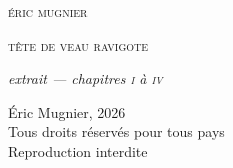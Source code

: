 \documentclass[12pt,twoside,openright]{memoir}
\begin{document}
\pagestyle{empty}

\begin{center}
\vspace*{6\onelineskip}
{\scshape\large éric mugnier}

\vspace{8\onelineskip}
{\scshape\huge tête de veau ravigote}

\vspace{2\onelineskip}
{\itshape extrait — chapitres \textsc{i} à \textsc{iv}}

\end{center}
\newpage
\thispagestyle{empty}
\vspace*{\fill}
{\footnotesize\noindent
\textcopyright{} Éric Mugnier, 2026\\
Tous droits réservés pour tous pays\\
Reproduction interdite
}
\cleardoublepage

\pagestyle{gallimard}
{\makeatletter\def\contentsline#1#2#3#4{}\makeatother}





\end{document}
